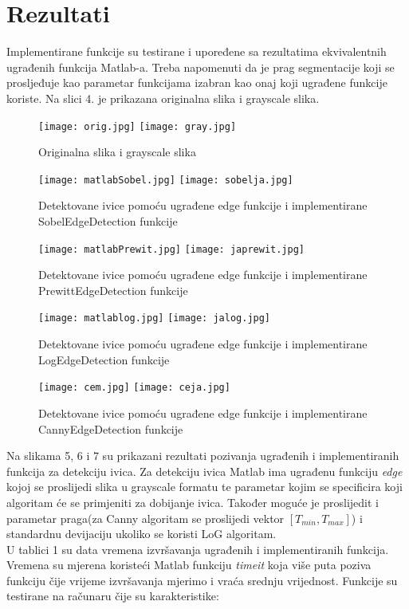 ﻿\documentclass[conference]{IEEEtran}
\begin{document}
\section{Rezultati}
Implementirane funkcije su testirane i upoređene sa rezultatima  ekvivalentnih ugrađenih funkcija Matlab-a. Treba napomenuti da je prag segmentacije koji se prosljeđuje kao parametar funkcijama izabran kao onaj koji ugrađene funkcije koriste. Na slici 4. je prikazana originalna slika i grayscale slika.
\begin{figure}[h!]
\centerline{\texttt{[image: orig.jpg]}
   \hspace{0.2cm}
\texttt{[image: gray.jpg]}
}
\caption{Originalna slika i grayscale slika}
\label{fig}
\end{figure}
\begin{figure}[htbp]
\centerline{\texttt{[image: matlabSobel.jpg]}
   \hspace{0.2cm}
\texttt{[image: sobelja.jpg]}
}
\caption{Detektovane ivice pomoću ugrađene edge funkcije i implementirane SobelEdgeDetection funkcije}
\label{fig}
\end{figure}
\begin{figure}[h!]
\centerline{\texttt{[image: matlabPrewit.jpg]}
   \hspace{0.2cm}
\texttt{[image: japrewit.jpg]}
}
\caption{Detektovane ivice pomoću ugrađene edge funkcije i implementirane PrewittEdgeDetection funkcije}
\label{fig}
\end{figure}
\begin{figure}[h!]
\centerline{\texttt{[image: matlablog.jpg]}
   \hspace{0.2cm}
\texttt{[image: jalog.jpg]}
}
\caption{Detektovane ivice pomoću ugrađene edge funkcije i implementirane LogEdgeDetection funkcije}
\label{fig}
\end{figure}
\begin{figure}[h!]
\centerline{\texttt{[image: cem.jpg]}
   \hspace{0.2cm}
\texttt{[image: ceja.jpg]}
}
\caption{Detektovane ivice pomoću ugrađene edge funkcije i implementirane CannyEdgeDetection funkcije}
\label{fig}
\end{figure}
Na slikama 5, 6 i 7 su prikazani rezultati pozivanja ugrađenih i implementiranih funkcija za detekciju ivica. Za detekciju ivica Matlab ima ugrađenu funkciju \textit{edge} kojoj se proslijedi slika u grayscale formatu te parametar kojim se specificira koji algoritam će se primjeniti za dobijanje ivica. Također moguće je proslijedit i parametar praga(za Canny algoritam se proslijedi vektor $[T_{min},  T_{max}]$) i standardnu devijaciju ukoliko se koristi LoG algoritam. \\U tablici 1 su data vremena izvršavanja ugrađenih i implementiranih funkcija. Vremena su mjerena koristeći Matlab funkciju  \textit{timeit} koja više puta poziva funkciju čije vrijeme izvršavanja mjerimo i vraća srednju vrijednost. Funkcije su testirane na računaru čije su karakteristike: 
\end{document}
